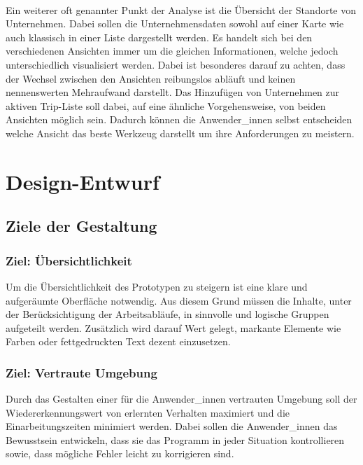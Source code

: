 \documentclass[Bachelorarbeit.tex]{subfiles}
\begin{document}
\\
Ein weiterer oft genannter Punkt der Analyse ist die Übersicht der Standorte von  Unternehmen. 
Dabei sollen die Unternehmensdaten sowohl auf einer Karte wie auch klassisch in einer Liste dargestellt werden. 
Es handelt sich bei den verschiedenen Ansichten immer um die gleichen Informationen, welche jedoch unterschiedlich visualisiert werden.
Dabei ist besonderes darauf zu achten, dass der Wechsel zwischen den Ansichten reibungslos abläuft und keinen nennenswerten Mehraufwand darstellt.
Das Hinzufügen von Unternehmen zur aktiven Trip-Liste soll dabei, auf eine ähnliche Vorgehensweise, von beiden Ansichten möglich sein. 
Dadurch können die Anwender\_innen selbst entscheiden welche Ansicht das beste Werkzeug darstellt um ihre Anforderungen zu meistern.


\section{Design-Entwurf}
\label{chap:entwicklung:sec:design_entwurf}

\subsection{Ziele der Gestaltung}
\label{chap:entwicklung:sec:design_entwurf:subs:ziele_der_gestaltung}

\subsubsection*{Ziel: Übersichtlichkeit}
\label{subsub:ziel_uebersichtlichkeit}
Um die Übersichtlichkeit des Prototypen zu steigern ist eine klare und aufgeräumte Oberfläche notwendig. 
Aus diesem Grund müssen die Inhalte, unter der Berücksichtigung der Arbeitsabläufe, in sinnvolle und logische Gruppen aufgeteilt werden. 
Zusätzlich wird darauf Wert gelegt, markante Elemente wie Farben oder fettgedruckten Text dezent einzusetzen. 


\subsubsection*{Ziel: Vertraute Umgebung}
\label{subsub:ziel_vertraute_umgebung}
Durch das Gestalten einer für die Anwender\_innen vertrauten Umgebung soll der Wiedererkennungswert von erlernten Verhalten maximiert und die Einarbeitungszeiten minimiert werden.
Dabei sollen die Anwender\_innen das Bewusstsein entwickeln, dass sie das Programm in jeder Situation kontrollieren sowie, dass mögliche Fehler leicht zu korrigieren sind.
\end{document}
